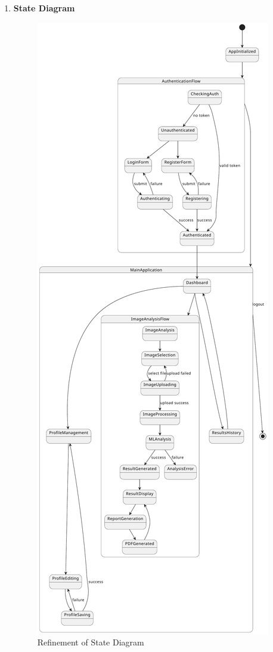 \begin{enumerate}[label=\roman*.]
    \item \textbf{State Diagram}
          \begin{center}
              \begin{figure}[H]
                  \centering
                  \includegraphics[width=0.6\linewidth]{Images/Refined/state.pdf}
                  \caption{Refinement of State Diagram}
                  \label{fig:RefinementofStateDiagram}
              \end{figure}
          \end{center}

\end{enumerate}
